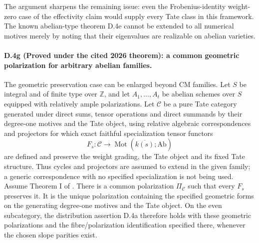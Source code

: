 The argument sharpens the remaining issue: even the
Frobenius-identity weight-zero case of the effectivity
claim would supply every Tate class in this framework.
The known abelian-type theorem D.4e cannot be extended
to all numerical motives merely by noting that their
eigenvalues are realizable on abelian varieties.

\paragraph{D.4g (Proved under the cited 2026 theorem): a common geometric polarization for arbitrary abelian families.}
The geometric preservation case can be enlarged beyond CM
families. Let $S$ be integral and of finite type over
$\mathbb Z$, and let $A_1,\ldots,A_t$ be abelian schemes
over $S$ equipped with relatively ample polarizations.
Let $\mathcal C$ be a pure Tate category generated under
direct sums, tensor operations and direct summands by
their degree-one motives and the Tate object, using
relative algebraic correspondences and projectors for
which exact faithful specialization tensor functors
\[
 F_s:\mathcal C\longrightarrow
          \operatorname{Mot}(\overline{k(s)};\mathrm{Ab})
\]
are defined and preserve the weight grading, the Tate
object and its fixed Tate structure. Thus cycles and projectors are assumed to
extend in the given family; a generic correspondence
with no specified specialization is not being used.
Assume Theorem I of \citet{D_VanHoftenSempliner2026}.
There is a common polarization $\Pi_{\mathcal C}$ such
that every $F_s$ preserves it. It is the unique
polarization containing the specified geometric forms
on the generating degree-one motives and the Tate
object. On the even subcategory, the distribution
assertion D.4a therefore holds with these geometric
polarizations and the fibre/polarization identification
specified there, whenever the chosen slope parities
exist.

